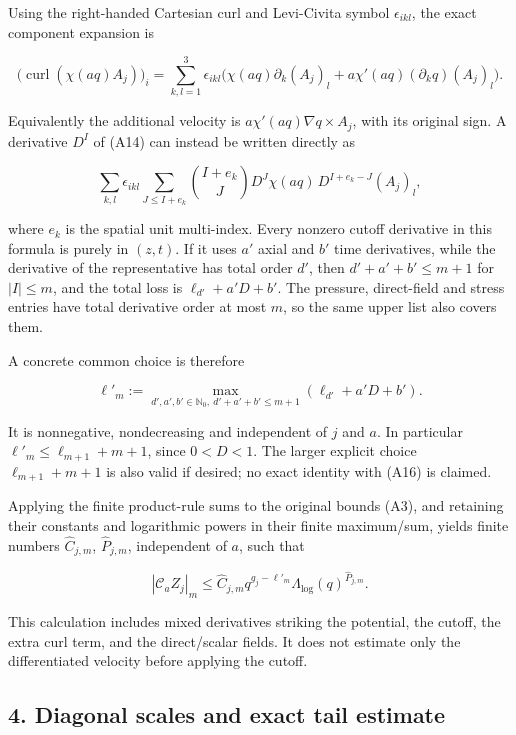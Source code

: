 \documentclass[10pt,a4paper]{article}
\begin{document}
Using the right-handed Cartesian curl and Levi-Civita symbol \(\epsilon_{ikl}\), the exact component expansion is

\[
\big(\operatorname{curl}(\chi(aq)A_j)\big)_i
=\sum_{k,l=1}^3\epsilon_{ikl}
\big(\chi(aq)\partial_k(A_j)_l
     +a\chi'(aq)(\partial_kq)(A_j)_l\big).
\tag{A14}
\]

Equivalently the additional velocity is \(a\chi'(aq)\nabla q\times A_j\), with its original sign. A derivative \(D^I\) of (A14) can instead be written directly as

\[
\sum_{k,l}\epsilon_{ikl}
\sum_{J\le I+e_k}\binom{I+e_k}{J}
 D^J\chi(aq)\,D^{I+e_k-J}(A_j)_l,
\tag{A15}
\]

where \(e_k\) is the spatial unit multi-index. Every nonzero cutoff derivative in this formula is purely in \((z,t)\). If it uses \(a'\) axial and \(b'\) time derivatives, while the derivative of the representative has total order \(d'\), then \(d'+a'+b'\le m+1\) for \(|I|\le m\), and the total loss is \(\ell_{d'}+a'D+b'\). The pressure, direct-field and stress entries have total derivative order at most \(m\), so the same upper list also covers them.

A concrete common choice is therefore

\[
\ell'_m:=\max_{d',a',b'\in\mathbb N_0,\ d'+a'+b'\le m+1}
                 (\ell_{d'}+a'D+b').
\tag{A16}
\]

It is nonnegative, nondecreasing and independent of \(j\) and \(a\). In particular \(\ell'_m\le\ell_{m+1}+m+1\), since \(0<D<1\). The larger explicit choice \(\ell_{m+1}+m+1\) is also valid if desired; no exact identity with (A16) is claimed.

Applying the finite product-rule sums to the original bounds (A3), and retaining their constants and logarithmic powers in their finite maximum/sum, yields finite numbers \(\widehat C_{j,m}\), \(\widehat P_{j,m}\), independent of \(a\), such that

\[
|\mathcal C_a Z_j|_m
\le \widehat C_{j,m}q^{g_j-\ell'_m}
          \Lambda_{\log}(q)^{\widehat P_{j,m}}.
\tag{A17}
\]

This calculation includes mixed derivatives striking the potential, the cutoff, the extra curl term, and the direct/scalar fields. It does not estimate only the differentiated velocity before applying the cutoff.

\subsection{4. Diagonal scales and exact tail estimate}\label{diagonal-scales-and-exact-tail-estimate}
\end{document}
